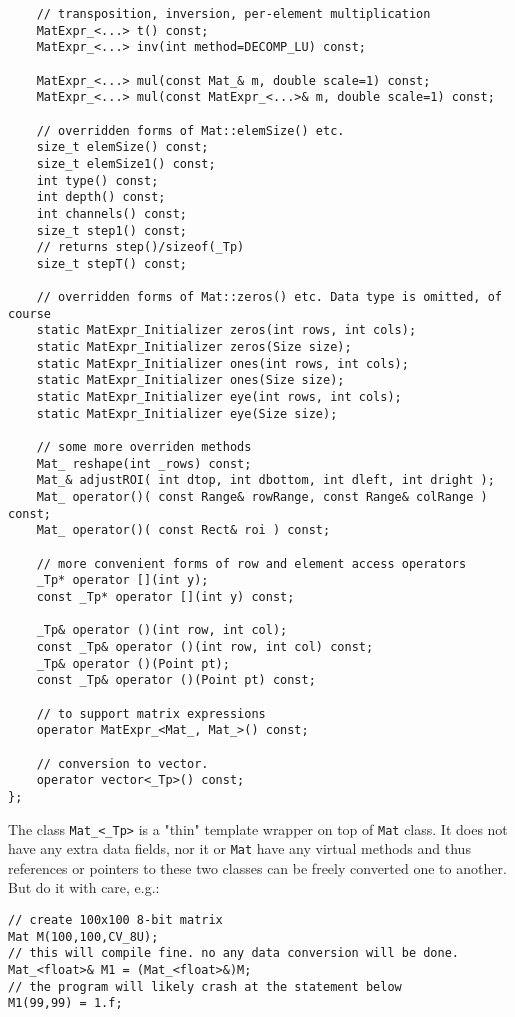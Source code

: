 \begin{lstlisting}
    // transposition, inversion, per-element multiplication
    MatExpr_<...> t() const;
    MatExpr_<...> inv(int method=DECOMP_LU) const;

    MatExpr_<...> mul(const Mat_& m, double scale=1) const;
    MatExpr_<...> mul(const MatExpr_<...>& m, double scale=1) const;

    // overridden forms of Mat::elemSize() etc.
    size_t elemSize() const;
    size_t elemSize1() const;
    int type() const;
    int depth() const;
    int channels() const;
    size_t step1() const;
    // returns step()/sizeof(_Tp)
    size_t stepT() const;

    // overridden forms of Mat::zeros() etc. Data type is omitted, of course
    static MatExpr_Initializer zeros(int rows, int cols);
    static MatExpr_Initializer zeros(Size size);
    static MatExpr_Initializer ones(int rows, int cols);
    static MatExpr_Initializer ones(Size size);
    static MatExpr_Initializer eye(int rows, int cols);
    static MatExpr_Initializer eye(Size size);

    // some more overriden methods
    Mat_ reshape(int _rows) const;
    Mat_& adjustROI( int dtop, int dbottom, int dleft, int dright );
    Mat_ operator()( const Range& rowRange, const Range& colRange ) const;
    Mat_ operator()( const Rect& roi ) const;

    // more convenient forms of row and element access operators 
    _Tp* operator [](int y);
    const _Tp* operator [](int y) const;

    _Tp& operator ()(int row, int col);
    const _Tp& operator ()(int row, int col) const;
    _Tp& operator ()(Point pt);
    const _Tp& operator ()(Point pt) const;

    // to support matrix expressions
    operator MatExpr_<Mat_, Mat_>() const;
    
    // conversion to vector.
    operator vector<_Tp>() const;
};
\end{lstlisting}

The class \texttt{Mat\_<\_Tp>} is a "thin" template wrapper on top of \texttt{Mat} class. It does not have any extra data fields, nor it or \texttt{Mat} have any virtual methods and thus references or pointers to these two classes can be freely converted one to another. But do it with care, e.g.:

\begin{lstlisting}
// create 100x100 8-bit matrix
Mat M(100,100,CV_8U);
// this will compile fine. no any data conversion will be done.
Mat_<float>& M1 = (Mat_<float>&)M;
// the program will likely crash at the statement below
M1(99,99) = 1.f;
\end{lstlisting}


